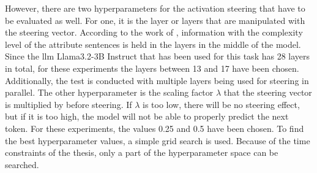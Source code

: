 However, there are two hyperparameters for the activation steering that have to be evaluated as well. For one, it is the layer or layers that are manipulated with the steering vector. According to the work of \citet{konenStyleVectorsSteering2024,bogdanEmergentEffectsScaling2025}, information with the complexity level of the attribute sentences is held in the layers in the middle of the model. Since the \ac{llm} Llama3.2-3B Instruct that has been used for this task has \num{28} layers in total, for these experiments the layers between \num{13} and \num{17} have been chosen. Additionally, the test is conducted with multiple layers being used for steering in parallel.
The other hyperparameter is the scaling factor \(\lambda\) that the steering vector is multiplied by before steering. If \(\lambda\) is too low, there will be no steering effect, but if it is too high, the model will not be able to properly predict the next token. For these experiments, the values \num{0.25} and \num{0.5} have been chosen.
To find the best hyperparameter values, a simple grid search is used. Because of the time constraints of the thesis, only a part of the hyperparameter space can be searched.
